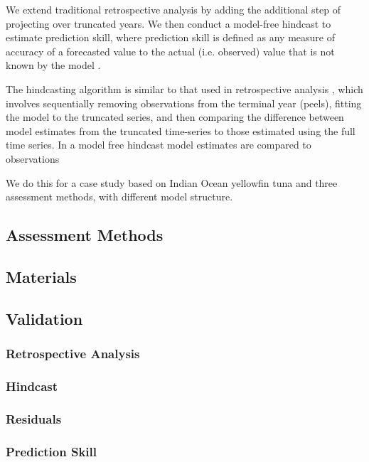 \documentclass[a4paper]{article}
\begin{document}
We extend traditional retrospective analysis by adding the additional step of projecting over truncated years. We then conduct a model-free hindcast \cite{kell2016xval} to estimate prediction skill, where prediction skill is defined as any measure of accuracy of a forecasted value to the actual (i.e. observed) value that is not known by the model \citep{glickman2000glossary}. 

The hindcasting algorithm is similar to that used in retrospective analysis \citep{hurtado2014looking}, which involves sequentially removing  observations from the terminal year (peels), fitting the model to the truncated series, and then comparing the difference between model estimates from the truncated time-series to those estimated using the full time series. In a model free hindcast model estimates are compared to observations 

We do this for a case study based on Indian Ocean yellowfin tuna and three assessment methods, with different model structure.  

\subsection{Assessment Methods}


\subsection{Materials}


\subsection{Validation}
\subsubsection{Retrospective Analysis}


\subsubsection{Hindcast}


\subsubsection{Residuals}


\subsubsection{Prediction Skill}

\end{document}
